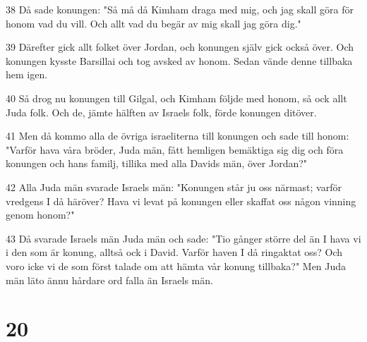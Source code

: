 \par 38 Då sade konungen: "Så må då Kimham draga med mig, och jag skall göra för honom vad du vill. Och allt vad du begär av mig skall jag göra dig."
\par 39 Därefter gick allt folket över Jordan, och konungen själv gick också över. Och konungen kysste Barsillai och tog avsked av honom. Sedan vände denne tillbaka hem igen.
\par 40 Så drog nu konungen till Gilgal, och Kimham följde med honom, så ock allt Juda folk. Och de, jämte hälften av Israels folk, förde konungen ditöver.
\par 41 Men då kommo alla de övriga israeliterna till konungen och sade till honom: "Varför hava våra bröder, Juda män, fått hemligen bemäktiga sig dig och föra konungen och hans familj, tillika med alla Davids män, över Jordan?"
\par 42 Alla Juda män svarade Israels män: "Konungen står ju oss närmast; varför vredgens I då häröver? Hava vi levat på konungen eller skaffat oss någon vinning genom honom?"
\par 43 Då svarade Israels män Juda män och sade: "Tio gånger större del än I hava vi i den som är konung, alltså ock i David. Varför haven I då ringaktat oss? Och voro icke vi de som först talade om att hämta vår konung tillbaka?" Men Juda män läto ännu hårdare ord falla än Israels män.

\chapter{20}


